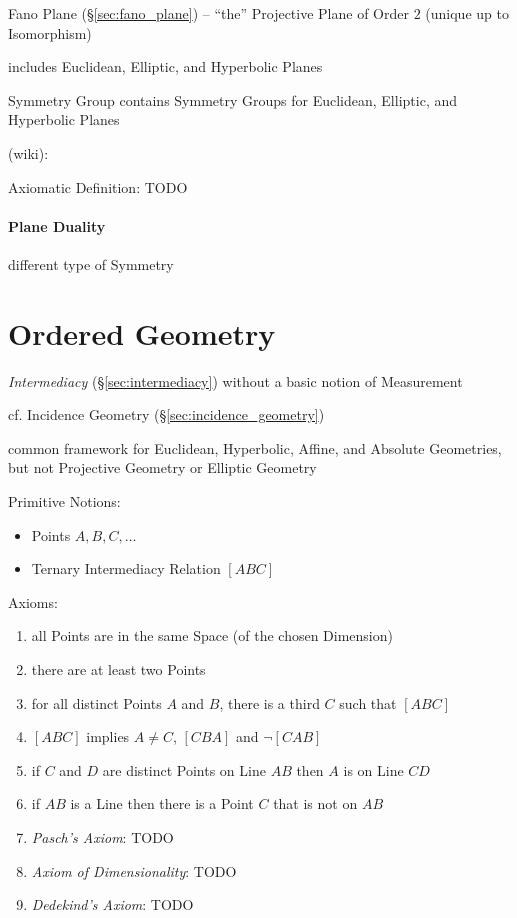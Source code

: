 Fano Plane (\S\ref{sec:fano_plane}) -- ``the'' Projective Plane of Order $2$
(unique up to Isomorphism)

includes Euclidean, Elliptic, and Hyperbolic Planes

Symmetry Group contains Symmetry Groups for Euclidean, Elliptic, and
Hyperbolic Planes

(wiki):

Axiomatic Definition: TODO



\paragraph{Plane Duality}\label{sec:plane_duality}\hfill

different type of Symmetry %



\section{Ordered Geometry}\label{sec:ordered_geometry}

\emph{Intermediacy} (\S\ref{sec:intermediacy}) without a basic notion of
Measurement

\fist cf. Incidence Geometry (\S\ref{sec:incidence_geometry})

common framework for Euclidean, Hyperbolic, Affine, and Absolute Geometries, but
not Projective Geometry or Elliptic Geometry

Primitive Notions:
\begin{itemize}
  \item Points $A, B, C, \ldots$
  \item Ternary Intermediacy Relation $[ABC]$
\end{itemize}

Axioms:
\begin{enumerate}
  \item all Points are in the same Space (of the chosen Dimension)
  \item there are at least two Points
  \item for all distinct Points $A$ and $B$, there is a third $C$ such that
    $[ABC]$
  \item $[ABC]$ implies $A \neq C$, $[CBA]$ and $\neg[CAB]$
  \item if $C$ and $D$ are distinct Points on Line $AB$ then $A$ is on Line $CD$
  \item if $AB$ is a Line then there is a Point $C$ that is not on $AB$
  \item \emph{Pasch's Axiom}: TODO
  \item \emph{Axiom of Dimensionality}: TODO
  \item \emph{Dedekind's Axiom}: TODO
\end{enumerate}

